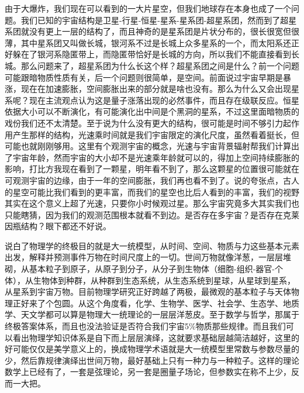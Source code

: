 \documentclass[
]{book}
\begin{document}
由于大爆炸，我们现在可以看到的一大片星空，但我们地球存在本身也成了一个问题。我们已知的宇宙结构是卫星-行星-恒星-星系-星系团-超星系团，然而到了超星系团就没有更上一层的结构了，而且神奇的是星系团是片状分布的，很长很宽但很薄，其中星系团又叫做长城，银河系不过是长城上众多星系的一个，而太阳系还正好躲在了银河系隐匿带上，而隐匿带恰好是长城的方向，所以我们不能直接看到长城。那么问题来了，超星系团为什么长这个样？超星系团之间是什么？前一个问题可能跟暗物质性质有关，后一个问题则很简单，是空间。前面说过宇宙早期是暴涨，现在在加速膨胀，空间膨胀出来的部分就是啥也没有。那么为什么又会出现星系呢？现在主流观点认为这是量子涨落出现的必然事件，而且存在级联反应。恒星依据大小可以不断演化，有可能演化出中间是个黑洞的星系，不过这里面暗物质的戏份我们还不太清楚。至于说为什么没有更大的结构，很可能是时间不够引力起作用产生那样的结构，光速乘时间就是我们宇宙限定的演化尺度，虽然看着挺长，但可能也就刚刚够用。这里有个观测宇宙的概念，光速与宇宙背景辐射帮我们计算出了宇宙年龄，然而宇宙的大小却不是光速乘年龄就可以的，得加上空间持续膨胀的影响，打比方我现在看到了一颗星，明年看不到了，那么这颗星的位置很可能就在可观测宇宙的边缘，由于一年的空间膨胀，我们再也看不到了。说的夸张点，古人的星空可能比我们看到的更丰富，而我们的星空也比后人看到的丰富，我们的视野其实在这个意义上超了光速，只要你小时候观过星。那么宇宙究竟多大其实我们也只能瞎猜，因为我们的观测范围根本就看不到边。是否存在多宇宙？是否存在克莱因瓶结构？眼下都还不好说。

说白了物理学的终极目的就是大一统模型，从时间、空间、物质与力这些基本元素出发，解释并预测事件万物在时间尺度上的一切。世间万物就像洋葱，一层层堆砌，从基本粒子到原子，从原子到分子，从分子到生物体（细胞-组织-器官-个体），从生物体到种群，从种群到生态系统，从生态系统到星球，从星球到星系，从星系到宇宙万物。目前物理学研究正好跨越了两极，最微观的基本粒子与天体物理正好来了个包圆。从这个角度看，化学、生物学、医学、社会学、生态学、地质学、天文学都可以算是物理大一统理论的一层层洋葱皮。至于数学与哲学，那属于终极答案体系，而且也没法验证是否符合我们宇宙5\%物质那些规律。而且我们可以看出物理学知识体系是自下而上层层演绎，这就要求基础层越简洁越好，这里的好可能仅仅是美学意义上的，换成物理学术语就是大一统模型里常数与参数尽量的少，然后靠规律演绎出世间万物，最好基础上只有一种力与一种粒子。这样的理论数学上已经有了，一套是弦理论，另一套是圈量子场论，但参数实在称不上少，反而一大把。
\end{document}
